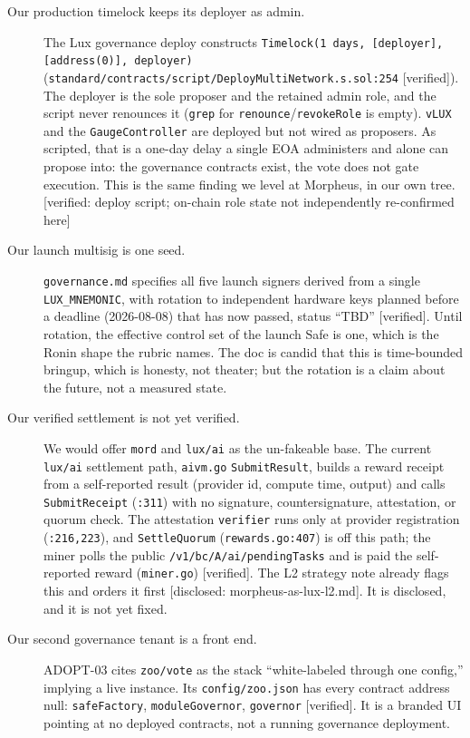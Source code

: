 \documentclass[11pt,a4paper]{article}
\newcommand{\code}[1]{\texttt{\small #1}}
\newcommand{\pv}[1]{{\color{muted}\sffamily\scriptsize[#1]}}
\begin{document}
\begin{description}
\item[Our production timelock keeps its deployer as admin.] The Lux governance
deploy constructs \code{Timelock(1 days, [deployer], [address(0)], deployer)}
(\code{standard/contracts/script/DeployMultiNetwork.s.sol:254} \pv{verified}). The
deployer is the sole proposer and the retained admin role, and the script never
renounces it (\code{grep} for \code{renounce}/\code{revokeRole} is empty).
\code{vLUX} and the \code{GaugeController} are deployed but not wired as proposers.
As scripted, that is a one-day delay a single EOA administers and alone can
propose into: the governance contracts exist, the vote does not gate execution.
This is the same finding we level at Morpheus, in our own tree. \pv{verified:
deploy script; on-chain role state not independently re-confirmed here}
\item[Our launch multisig is one seed.] \code{governance.md} specifies all five
launch signers derived from a single \code{LUX\_MNEMONIC}, with rotation to
independent hardware keys planned before a deadline (2026-08-08) that has now
passed, status ``TBD'' \pv{verified}. Until rotation, the effective control set of
the launch Safe is one, which is the Ronin shape the rubric names. The doc is
candid that this is time-bounded bringup, which is honesty, not theater; but the
rotation is a claim about the future, not a measured state.
\item[Our verified settlement is not yet verified.] We would offer \code{mord} and
\code{lux/ai} as the un-fakeable base. The current \code{lux/ai} settlement path,
\code{aivm.go} \code{SubmitResult}, builds a reward receipt from a self-reported
result (provider id, compute time, output) and calls \code{SubmitReceipt}
(\code{:311}) with no signature, countersignature, attestation, or quorum check.
The attestation \code{verifier} runs only at provider registration (\code{:216,223}),
and \code{SettleQuorum} (\code{rewards.go:407}) is off this path; the miner polls
the public \code{/v1/bc/A/ai/pendingTasks} and is paid the self-reported reward
(\code{miner.go}) \pv{verified}. The L2 strategy note already flags this and orders
it first \pv{disclosed: morpheus-as-lux-l2.md}. It is disclosed, and it is not yet
fixed.
\item[Our second governance tenant is a front end.] ADOPT-03 cites \code{zoo/vote}
as the stack ``white-labeled through one config,'' implying a live instance. Its
\code{config/zoo.json} has every contract address null: \code{safeFactory},
\code{moduleGovernor}, \code{governor} \pv{verified}. It is a branded UI pointing at
no deployed contracts, not a running governance deployment.
\end{description}
\end{document}
